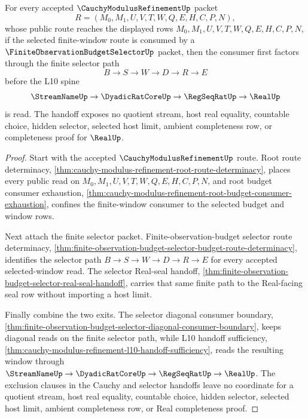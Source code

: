 \begin{theorem}
\label{thm:cauchy-modulus-refinement-finite-observation-budget-selector-handoff}
For every accepted $\CauchyModulusRefinementUp$ packet
$$
R=(M_0,M_1,U,V,T,W,Q,E,H,C,P,N),
$$
whose public route reaches the displayed rows $M_0,M_1,U,V,T,W,Q,E,H,C,P,N$,
if the selected finite-window route is consumed by a
$\FiniteObservationBudgetSelectorUp$ packet, then the consumer first factors
through the finite selector path
$$
B \to S \to W \to D \to R \to E
$$
before the L10 spine
$$
\StreamNameUp \to \DyadicRatCoreUp \to \RegSeqRatUp \to \RealUp
$$
is read. The handoff exposes no quotient stream, host real equality, countable
choice, hidden selector, selected host limit, ambient completeness row, or
completeness proof for $\RealUp$.
\end{theorem}
\begin{proof}
Start with the accepted $\CauchyModulusRefinementUp$ route. Root route
determinacy, \autoref{thm:cauchy-modulus-refinement-root-route-determinacy},
places every public read on $M_0,M_1,U,V,T,W,Q,E,H,C,P,N$, and root budget
consumer exhaustion,
\autoref{thm:cauchy-modulus-refinement-root-budget-consumer-exhaustion},
confines the finite-window consumer to the selected budget and window rows.

Next attach the finite selector packet. Finite-observation-budget selector route
determinacy,
\autoref{thm:finite-observation-budget-selector-budget-route-determinacy},
identifies the selector path $B \to S \to W \to D \to R \to E$ for every
accepted selected-window read. The selector Real-seal handoff,
\autoref{thm:finite-observation-budget-selector-real-seal-handoff}, carries
that same finite path to the Real-facing seal row without importing a host
limit.

Finally combine the two exits. The selector diagonal consumer boundary,
\autoref{thm:finite-observation-budget-selector-diagonal-consumer-boundary},
keeps diagonal reads on the finite selector path, while L10 handoff sufficiency,
\autoref{thm:cauchy-modulus-refinement-l10-handoff-sufficiency}, reads the
resulting window through
$\StreamNameUp \to \DyadicRatCoreUp \to \RegSeqRatUp \to \RealUp$. The
exclusion clauses in the Cauchy and selector handoffs leave no coordinate for a
quotient stream, host real equality, countable choice, hidden selector, selected
host limit, ambient completeness row, or Real completeness proof.
\end{proof}

